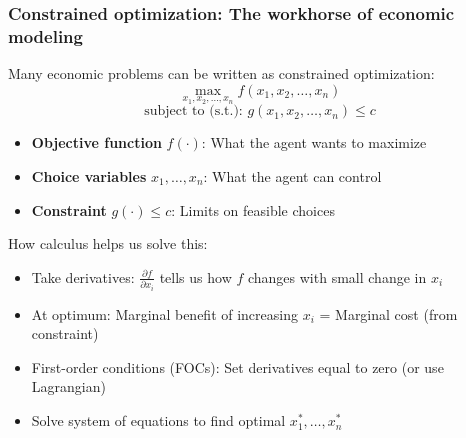 \documentclass[aspectratio=169]{beamer}
\begin{document}
\begin{frame}
\frametitle{Constrained optimization: The workhorse of economic modeling}
Many economic problems can be written as constrained optimization:
\begin{equation*}
\max_{x_1, x_2, \ldots, x_n} f(x_1, x_2, \ldots, x_n)
\end{equation*}
\begin{equation*}
\text{subject to (s.t.): } g(x_1, x_2, \ldots, x_n) \leq c
\end{equation*}\vspace{-15pt}
\begin{itemize}\setlength\itemsep{3pt}
\item \textbf{Objective function} $f(\cdot)$: What the agent wants to maximize
\item \textbf{Choice variables} $x_1, \ldots, x_n$: What the agent can control
\item \textbf{Constraint} $g(\cdot) \leq c$: Limits on feasible choices
\end{itemize} \medskip

How calculus helps us solve this:
\begin{itemize}\setlength\itemsep{3pt}
\item Take derivatives: $\frac{\partial f}{\partial x_i}$ tells us how $f$ changes with small change in $x_i$
\item At optimum: Marginal benefit of increasing $x_i$ = Marginal cost (from constraint)
\item First-order conditions (FOCs): Set derivatives equal to zero (or use Lagrangian)
\item Solve system of equations to find optimal $x_1^*, \ldots, x_n^*$
\end{itemize}
\end{frame}
\end{document}
